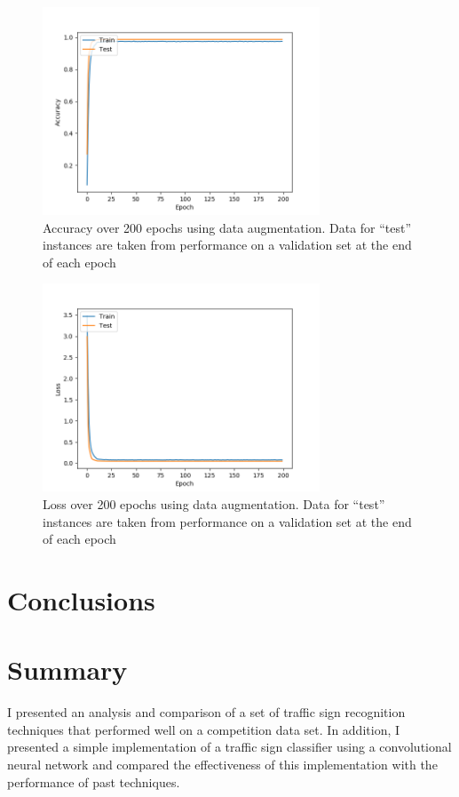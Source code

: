 \documentclass[letterpaper,twocolumn,10pt]{article}
\begin{document}
\begin{figure}
\includegraphics[width=3.25in]{accuracy}
\caption{Accuracy over 200 epochs using data augmentation. Data for ``test'' instances are taken from performance on a validation set at the end of each epoch}
\end{figure}

\begin{figure}
\includegraphics[width=3.25in]{loss}
\caption{Loss over 200 epochs using data augmentation. Data for ``test'' instances are taken from performance on a validation set at the end of each epoch}
\end{figure}


\section{Conclusions}


\section{Summary}

I presented an analysis and comparison of a set of traffic sign recognition techniques that performed well on a competition data set. In addition, I presented a simple implementation of a traffic sign classifier using a convolutional neural network and compared the effectiveness of this implementation with the performance of past techniques.


{\footnotesize 
}
\end{document}
